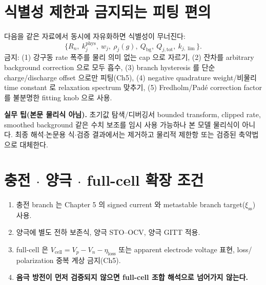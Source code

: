 \documentclass[11pt,a4paper]{article}
\newcommand{\tot}{\mathrm{tot}}
\newcommand{\bg}{\mathrm{bg}}
\newcommand{\cell}{\mathrm{cell}}
\begin{document}
\section{식별성 제한과 금지되는 피팅 편의}\label{sec:ch6_ident}
다음을 같은 자료에서 동시에 자유화하면 식별성이 무너진다:
\begin{equation}
\{R_n,\ k_j^{\mathrm{phys}},\ w_j,\ \rho_j(g),\ Q_\bg,\ Q_{j,\tot},\ k_{j,\lim}\}.
\label{eq:ch6_no_free}
\end{equation}
금지: (1) 강구동 rate 폭주를 물리 의미 없는 cap 으로 자르기, (2) 잔차를 arbitrary background correction 으로
모두 흡수, (3) branch hysteresis 를 단순 charge/discharge offset 으로만 피팅(Ch5), (4) negative quadrature
weight/비물리 time constant 로 relaxation spectrum 맞추기, (5) Fredholm/Padé correction factor 를 불분명한
fitting knob 으로 사용.
\begin{mdframed}
\textbf{실무 팁(본문 물리식 아님).} 초기값 탐색/디버깅서 bounded transform, clipped rate, smoothed background
같은 수치 보조를 임시 사용 가능하나 본 모델 물리식이 아니다. 최종 해석$\cdot$논문용 식$\cdot$검증 결과에서는
제거하고 물리적 제한항 또는 검증된 축약법으로 대체한다.
\end{mdframed}

\section{충전 $\cdot$ 양극 $\cdot$ full-cell 확장 조건}\label{sec:ch6_extension}
\begin{enumerate}[label=E\arabic*),leftmargin=2.2em]
\item 충전 branch 는 Chapter 5 의 signed current 와 metastable branch target($\xi_{\mathrm{ss}}$) 사용.
\item 양극에 별도 전하 보존식, 양극 STO--OCV, 양극 GITT 적용.
\item full-cell 은 $V_{\cell}=V_p-V_n-\eta_{\mathrm{loss}}$ 또는 apparent electrode voltage 표현, loss/
  polarization 중복 계상 금지(Ch5).
\item \textbf{음극 방전이 먼저 검증되지 않으면 full-cell 조합 해석으로 넘어가지 않는다.}
\end{enumerate}

\end{document}
